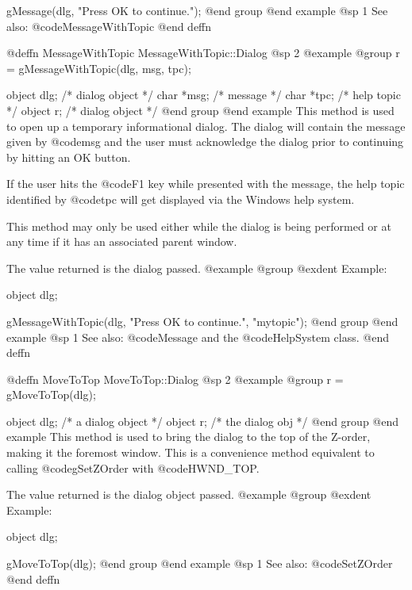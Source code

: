 gMessage(dlg, "Press OK to continue.");
@end group
@end example
@sp 1
See also:  @code{MessageWithTopic}
@end deffn












@deffn {MessageWithTopic} MessageWithTopic::Dialog
@sp 2
@example
@group
r = gMessageWithTopic(dlg, msg, tpc);

object  dlg;    /*  dialog object  */
char    *msg;   /*  message        */
char    *tpc;   /*  help topic     */
object  r;      /*  dialog object  */
@end group
@end example
This method is used to open up a temporary informational dialog.  The
dialog will contain the message given by @code{msg} and the user must
acknowledge the dialog prior to continuing by hitting an OK button.

If the user hits the @code{F1} key while presented with the message,
the help topic identified by @code{tpc} will get displayed via the Windows
help system.

This method may only be used either while the dialog is being performed
or at any time if it has an associated parent window.

The value returned is the dialog passed.
@example
@group
@exdent Example:

object  dlg;

gMessageWithTopic(dlg, "Press OK to continue.", "mytopic");
@end group
@end example
@sp 1
See also:  @code{Message} and the @code{HelpSystem} class.
@end deffn














@deffn {MoveToTop} MoveToTop::Dialog
@sp 2
@example
@group
r = gMoveToTop(dlg);

object  dlg;   /*  a dialog object  */
object  r;     /*  the dialog obj   */
@end group
@end example
This method is used to bring the dialog to the top of the Z-order,
making it the foremost window.  This is a convenience method equivalent
to calling @code{gSetZOrder} with @code{HWND_TOP}.

The value returned is the dialog object passed.
@example
@group
@exdent Example:

object  dlg;

gMoveToTop(dlg);
@end group
@end example
@sp 1
See also:  @code{SetZOrder}
@end deffn




